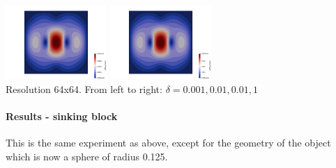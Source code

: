 \begin{center}
\includegraphics[width=3.84cm]{python_codes/fieldstone_78/results/block/vel_delta0p1}
\includegraphics[width=3.84cm]{python_codes/fieldstone_78/results/block/vel_delta1}\\
{\captionfont Resolution 64x64. From left to right: $\delta=0.001,0.01,0.01,1$}
\end{center}

\paragraph{Results - sinking block}

This is the same experiment as above, except for the geometry of the object 
which is now a sphere of radius 0.125.

